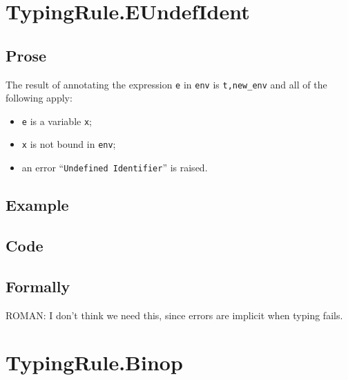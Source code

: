 \documentclass{book}
\begin{document}
\section{TypingRule.EUndefIdent \label{sec:TypingRule.EUndefIdent}}

  \subsection{Prose}
  The result of annotating the expression \texttt{e} in \texttt{env} is
\texttt{t,new\_env} and all of the following apply:
  \begin{itemize}
  \item \texttt{e} is a variable \texttt{x};
  \item \texttt{x} is not bound in \texttt{env};
  \item an error ``\texttt{Undefined Identifier}'' is raised.
  \end{itemize}

  \subsection{Example}

  \subsection{Code}

\begin{emptyformal}
  \subsection{Formally}
\begin{emptytodo}
ROMAN: I don't think we need this, since errors are implicit when typing fails.
\end{emptytodo}
\end{emptyformal}


\section{TypingRule.Binop \label{sec:TypingRule.Binop}}
\end{document}
